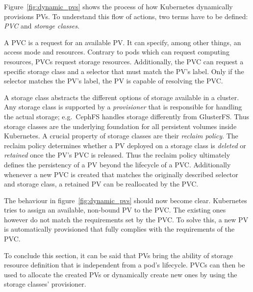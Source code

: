 Figure~\ref{fig:dynamic_pvs} shows the process of how Kubernetes dynamically
provisions \acp{PV}. To understand this flow of actions, two terms have to be
defined: \textit{\acf{PVC}} and \textit{storage classes}. 

A \ac{PVC} is a request for an available \ac{PV}. It can specify, among other
things, an access mode and resources. Contrary to pods which can request
computing resources, \acp{PVC} request storage resources. Additionally, the
\ac{PVC} can request a specific storage class and a selector that must match
the \ac{PV}'s label. Only if the selector matches the \ac{PV}'s label, the
\ac{PV} is capable of resolving the \ac{PVC}.

A storage class abstracts the different options of storage available in a
cluster. Any storage class is supported by a \textit{provisioner} that is
responsible for handling the actual storage; e.g.\ CephFS handles storage
differently from GlusterFS. Thus storage classes are the underlying foundation
for all persistent volumes inside Kubernetes. A crucial property of storage
classes are their \textit{reclaim policy}. The reclaim policy determines
whether a \ac{PV} deployed on a storage class is \textit{deleted} or
\textit{retained} once the \ac{PV}'s \ac{PVC} is released. Thus the reclaim
policy ultimately defines the persistency of a \ac{PV} beyond the lifecycle of
a \ac{PVC}. Additionally whenever a new \ac{PVC} is created that matches the
originally described selector and storage class, a retained \ac{PV} can be
reallocated by the \ac{PVC}.

The behaviour in figure~\ref{fig:dynamic_pvs} should now become clear.
Kubernetes tries to assign an available, non-bound \ac{PV} to the \ac{PVC}.
The existing ones however do not match the requirements set by the \ac{PVC}. To
solve this, a new \ac{PV} is automatically provisioned that fully complies with
the requirements of the \ac{PVC}.

To conclude this section, it can be said that \acp{PV} bring the ability of
storage resource definition that is independent from a pod's lifecycle.
\acp{PVC} can then be used to allocate the created \acp{PV} or dynamically
create new ones by using the storage classes' provisioner.

